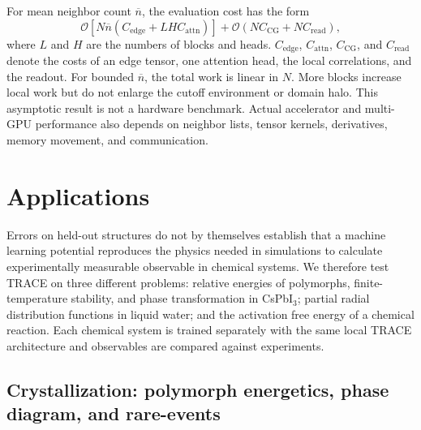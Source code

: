 \documentclass[aps,prx,preprint,notitlepage,superscriptaddress,nofootinbib,floatfix]{revtex4-2}
\begin{document}
For mean neighbor count $\overline n$, the evaluation cost has the form
\begin{equation}
 \mathcal O\!\left[N\overline n
 \left(C_{\mathrm{edge}}+L H C_{\mathrm{attn}}\right)\right]
 +\mathcal O\!\left(N C_{\mathrm{CG}}+N C_{\mathrm{read}}\right),
 \label{eq:scaling}
\end{equation}
where $L$ and $H$ are the numbers of blocks and heads.
$C_{\mathrm{edge}}$, $C_{\mathrm{attn}}$, $C_{\mathrm{CG}}$, and
$C_{\mathrm{read}}$ denote the costs of an edge tensor, one attention head,
the local correlations, and the readout. For bounded $\overline n$, the total
work is linear in $N$. More blocks increase local work but do not enlarge the
cutoff environment or domain halo. This asymptotic result is not a hardware
benchmark. Actual accelerator and multi-GPU performance also depends on
neighbor lists, tensor kernels, derivatives, memory movement, and
communication.

\section{Applications}
Errors on held-out structures do not by themselves establish
that a machine learning potential reproduces the physics needed in simulations to calculate experimentally measurable observable in chemical systems. We therefore test TRACE on three different problems: relative energies of polymorphs, finite-temperature stability, and phase transformation in CsPbI$_3$; partial radial distribution functions in liquid water; and the activation free energy of a chemical reaction. Each chemical system is trained separately with the same local TRACE architecture and observables are compared against experiments. 

\subsection{Crystallization: polymorph energetics, phase diagram, and rare-events}
\end{document}

